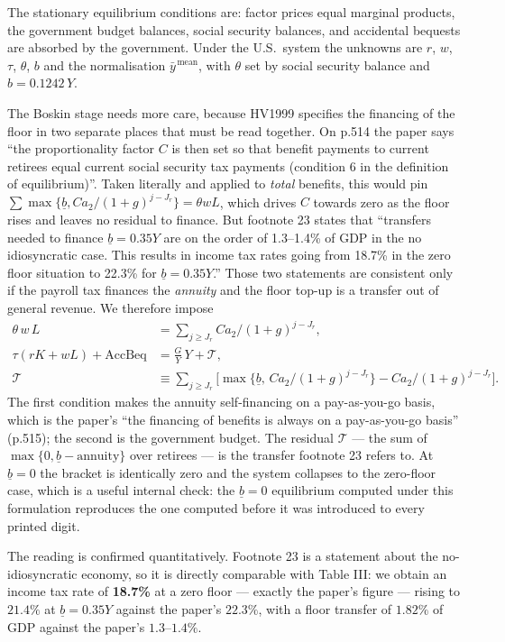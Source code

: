\documentclass[11pt,fleqn]{article}
\begin{document}
The stationary equilibrium conditions are: factor prices equal marginal products, the government budget balances, social security balances, and accidental bequests
are absorbed by the government. Under the U.S.\ system the unknowns are
$r$, $w$, $\tau$, $\theta$, $b$ and the normalisation $\bar{y}^{\,\text{mean}}$, with $\theta$
set by social security balance and $b=0.1242\,Y$.

The Boskin stage needs more care, because HV1999 specifies the financing of the floor in two
separate places that must be read together. On p.514 the paper says ``the proportionality
factor $C$ is then set so that benefit payments to current retirees equal current social
security tax payments (condition 6 in the definition of equilibrium)''. Taken literally and
applied to \emph{total} benefits, this would pin
$\sum \max\{\underline{b},Ca_2/(1+g)^{j-J_r}\} = \theta w L$, which drives $C$ towards zero as
the floor rises and leaves no residual to finance. But footnote 23 states that ``transfers
needed to finance $\underline{b}=0.35Y$ are on the order of 1.3--1.4\% of GDP in the no
idiosyncratic case. This results in income tax rates going from 18.7\% in the zero floor
situation to 22.3\% for $\underline{b}=0.35Y$.'' Those two statements are consistent only if
the payroll tax finances the \emph{annuity} and the floor top-up is a transfer out of general
revenue. We therefore impose
\begin{align*}
 \theta\, w\, L &= \textstyle\sum_{j\ge J_r} C a_2/(1+g)^{j-J_r},\\
 \tau(rK+wL) + \text{AccBeq} &= \tfrac{G}{Y}\,Y + \mathcal{T},\\
 \mathcal{T} &\equiv \textstyle\sum_{j\ge J_r}
   \Big[\max\big\{\underline{b},\,Ca_2/(1+g)^{j-J_r}\big\} - Ca_2/(1+g)^{j-J_r}\Big].
\end{align*}
The first condition makes the annuity self-financing on a pay-as-you-go basis, which is the
paper's ``the financing of benefits is always on a pay-as-you-go basis'' (p.515); the second
is the government budget. The residual $\mathcal{T}$ --- the sum of
$\max\{0,\underline{b}-\text{annuity}\}$ over retirees --- is
the transfer footnote 23 refers to. At $\underline{b}=0$ the bracket is identically zero and
the system collapses to the zero-floor case, which is a useful internal check: the
$\underline{b}=0$ equilibrium computed under this formulation reproduces the one computed
before it was introduced to every printed digit.

The reading is confirmed quantitatively. Footnote 23 is a statement about the
no-idiosyncratic economy, so it is directly comparable with Table III: we obtain an income
tax rate of \textbf{18.7\%} at a zero floor --- exactly the paper's figure --- rising to
$21.4\%$ at $\underline{b}=0.35Y$ against the paper's $22.3\%$, with a floor transfer of
$1.82\%$ of GDP against the paper's $1.3$--$1.4\%$.
\end{document}
